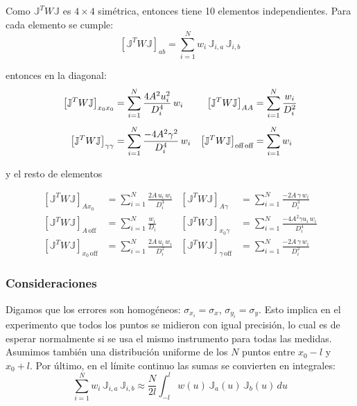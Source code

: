 Como $\mathbb{J}^T W \mathbb{J}$ es $4\times4$ simétrica, entonces tiene 10 elementos independientes. Para cada elemento se cumple:
\begin{equation}
    \left[\mathbb{J}^T W \mathbb{J}\right]_{ab} = \sum_{i=1}^{N} w_i\,\mathbb{J}_{i,a}\,\mathbb{J}_{i,b}
\end{equation}

entonces en la diagonal:
\begin{align}
    \left[\mathbb{J}^T W \mathbb{J}\right]_{x_0 x_0} &= \sum_{i=1}^{N} \frac{4A^2 u_i^2}{D_i^4}\,w_i &
    \left[\mathbb{J}^T W \mathbb{J}\right]_{AA} &= \sum_{i=1}^{N} \frac{w_i}{D_i^2} \nonumber\\[4pt]
    \left[\mathbb{J}^T W \mathbb{J}\right]_{\gamma\gamma} &= \sum_{i=1}^{N} \frac{-4A^2\gamma^2}{D_i^4}\,w_i &
    \left[\mathbb{J}^T W \mathbb{J}\right]_{\text{off\,off}} &= \sum_{i=1}^{N} w_i \label{eq:diagonal}
\end{align}

y el resto de elementos

\begin{align}
    \left[\mathbb{J}^T W \mathbb{J}\right]_{A x_0} &= \sum_{i=1}^{N} \frac{2A\,u_i\,w_i}{D_i^3} &
    \left[\mathbb{J}^T W \mathbb{J}\right]_{A\gamma} &= \sum_{i=1}^{N} \frac{-2A\,\gamma\,w_i}{D_i^3} \nonumber\\[4pt]
    \left[\mathbb{J}^T W \mathbb{J}\right]_{A\,\text{off}} &= \sum_{i=1}^{N} \frac{w_i}{D_i} &
    \left[\mathbb{J}^T W \mathbb{J}\right]_{x_0\gamma} &= \sum_{i=1}^{N} \frac{-4A^2\gamma u_i\,w_i}{D_i^4} \nonumber\\[4pt]
    \left[\mathbb{J}^T W \mathbb{J}\right]_{x_0\,\text{off}} &= \sum_{i=1}^{N} \frac{2A\,u_i\,w_i}{D_i^2} &
    \left[\mathbb{J}^T W \mathbb{J}\right]_{\gamma\,\text{off}} &= \sum_{i=1}^{N} \frac{-2A\,\gamma\,w_i}{D_i^2} \label{eq:fuera_diag}
\end{align}

\subsubsection{Consideraciones}

Digamos que los errores son homogéneos: $\sigma_{x_i} = \sigma_x$, $\sigma_{y_i} = \sigma_y$. Esto implica en el experimento que todos los puntos se midieron con igual precisión, lo cual es de esperar normalmente si se usa el mismo instrumento para todas las medidas. Asumimos también una distribución uniforme de los $N$ puntos entre $x_0 - l$ y $x_0 + l$. Por último, en el límite continuo las sumas se convierten en integrales:
\begin{equation}
    \sum_{i=1}^{N} w_i\,\mathbb{J}_{i,a}\,\mathbb{J}_{i,b} \approx \frac{N}{2l} \int_{-l}^{l} w(u)\,\mathbb{J}_{a}(u)\,\mathbb{J}_{b}(u)\,du \label{eq:integral}
\end{equation} 

